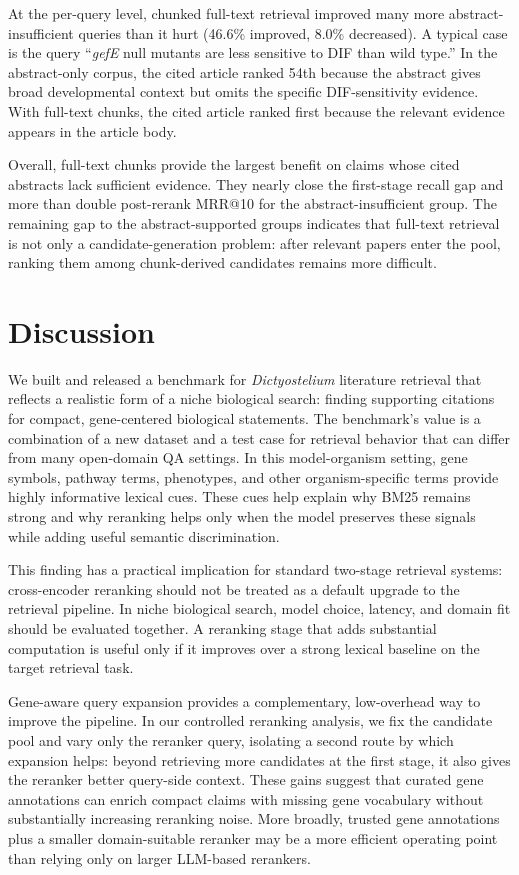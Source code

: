 \documentclass[runningheads]{llncs}
\begin{document}
At the per-query level, chunked full-text retrieval improved many more abstract-insufficient queries than it hurt (46.6\% improved, 8.0\% decreased). A typical case is the query ``\emph{gefE} null mutants are less sensitive to DIF than wild type.'' In the abstract-only corpus, the cited article ranked 54th because the abstract gives broad developmental context but omits the specific DIF-sensitivity evidence. With full-text chunks, the cited article ranked first because the relevant evidence appears in the article body.

Overall, full-text chunks provide the largest benefit on claims whose cited abstracts lack sufficient evidence. They nearly close the first-stage recall gap and more than double post-rerank MRR@10 for the abstract-insufficient group. The remaining gap to the abstract-supported groups indicates that full-text retrieval is not only a candidate-generation problem: after relevant papers enter the pool, ranking them among chunk-derived candidates remains more difficult.



\FloatBarrier
\section{Discussion}
\label{sec:discussion}
We built and released a benchmark for \emph{Dictyostelium} literature retrieval that reflects a realistic form of a niche biological search: finding supporting citations for compact, gene-centered biological statements. The benchmark's value is a combination of a new dataset and a test case for retrieval behavior that can differ from many open-domain QA settings. In this model-organism setting, gene symbols, pathway terms, phenotypes, and other organism-specific terms provide highly informative lexical cues. These cues help explain why BM25 remains strong and why reranking helps only when the model preserves these signals while adding useful semantic discrimination.

This finding has a practical implication for standard two-stage retrieval systems: cross-encoder reranking should not be treated as a default upgrade to the retrieval pipeline. In niche biological search, model choice, latency, and domain fit should be evaluated together. A reranking stage that adds substantial computation is useful only if it improves over a strong lexical baseline on the target retrieval task. 

Gene-aware query expansion provides a complementary, low-overhead way to improve the pipeline.
In our controlled reranking analysis, we fix the candidate pool and vary only the
reranker query, isolating a second route by which expansion helps: beyond
retrieving more candidates at the first stage, it also gives the reranker better
query-side context. These gains suggest that curated gene annotations can enrich
compact claims with missing gene vocabulary without substantially increasing
reranking noise. More broadly, trusted gene annotations plus a smaller domain-suitable
reranker may be a more efficient operating point than relying only on larger
LLM-based rerankers.
\end{document}
